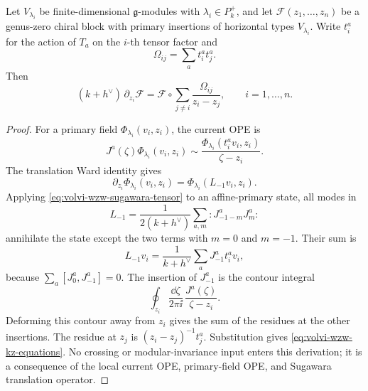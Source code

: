 \begin{proposition}
\label{prop:volvi-wzw-kz-equations}
Let \(V_{\lambda_i}\) be finite-dimensional \(\mathfrak g\)-modules with
\(\lambda_i\in P_k^+\), and let
\(\mathcal F(z_1,\ldots,z_n)\) be a genus-zero chiral block with primary
insertions of horizontal types \(V_{\lambda_i}\).  Write \(t_i^a\) for the
action of \(T_a\) on the \(i\)-th tensor factor and
\[
  \Omega_{ij}=\sum_a t_i^a t_j^a .
\]
Then
\begin{equation}
  (k+h^\vee)\,\partial_{z_i}\mathcal F
  =
  \mathcal F\circ
  \sum_{j\ne i}\frac{\Omega_{ij}}{z_i-z_j},
  \qquad i=1,\ldots,n .
  \label{eq:volvi-wzw-kz-equations}
\end{equation}
\end{proposition}

\begin{proof}
For a primary field \(\Phi_{\lambda_i}(v_i,z_i)\), the current OPE is
\[
  J^a(\zeta)\Phi_{\lambda_i}(v_i,z_i)
  \sim
  \frac{\Phi_{\lambda_i}(t_i^av_i,z_i)}{\zeta-z_i}.
\]
The translation Ward identity gives
\[
  \partial_{z_i}\Phi_{\lambda_i}(v_i,z_i)
  =
  \Phi_{\lambda_i}(L_{-1}v_i,z_i).
\]
Applying \eqref{eq:volvi-wzw-sugawara-tensor} to an affine-primary state,
all modes in
\[
  L_{-1}
  =
  \frac{1}{2(k+h^\vee)}
  \sum_{a,m}:J^a_{-1-m}J^a_m:
\]
annihilate the state except the two terms with \(m=0\) and \(m=-1\).  Their
sum is
\[
  L_{-1}v_i
  =
  \frac{1}{k+h^\vee}\sum_a J^a_{-1}t_i^av_i ,
\]
because \(\sum_a[J_0^a,J_{-1}^a]=0\).  The insertion of \(J^a_{-1}\) is the
contour integral
\[
  \oint_{z_i}\frac{\dd\zeta}{2\pi\ii}\,
  \frac{J^a(\zeta)}{\zeta-z_i}.
\]
Deforming this contour away from \(z_i\) gives the sum of the residues at the
other insertions.  The residue at \(z_j\) is
\((z_i-z_j)^{-1}t_j^a\).  Substitution gives
\eqref{eq:volvi-wzw-kz-equations}.  No crossing or modular-invariance input
enters this derivation; it is a consequence of the local current OPE,
primary-field OPE, and Sugawara translation operator.
\end{proof}

